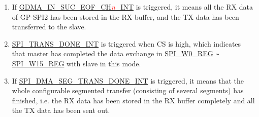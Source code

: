 \documentclass[main\_\_EN.tex]{subfiles}
\begin{document}
\begin{tiplisting}
\vspace{-2em}
\begin{enumerate}

\item If \hyperref[int:GDMAINSUCEOFINT]{GDMA\_IN\_SUC\_EOF\_CH\textcolor{red}{\it{n}}\_INT} is triggered, it means all the RX data of GP-SPI2 has been stored in the RX buffer, and the TX data has been transferred to the slave.\label{other:spi-item-gp-spi2-master-interrupts-note-1}

\item \hyperref[int:SPITRANSDONEINT]{SPI\_TRANS\_DONE\_INT} is triggered when CS is high, which indicates that master has completed the data exchange in \hyperref[regdesc:SPIW0REG]{SPI\_W0\_REG}  \verb+~+ \hyperref[regdesc:SPIW15REG]{SPI\_W15\_REG}  with slave in this mode.\label{other:spi-item-gp-spi2-master-interrupts-note-2}

\item If \hyperref[int:SPIDMASEGTRANSDONEINT]{SPI\_DMA\_SEG\_TRANS\_DONE\_INT} is triggered, it means that the whole configurable segmented transfer (consisting of several segments) has finished, i.e. the RX data has been stored in the RX buffer completely and all the TX data has been sent out. \label{other:spi-item-gp-spi2-master-interrupts-note-3}
\end{enumerate}
\end{tiplisting}
\end{document}
